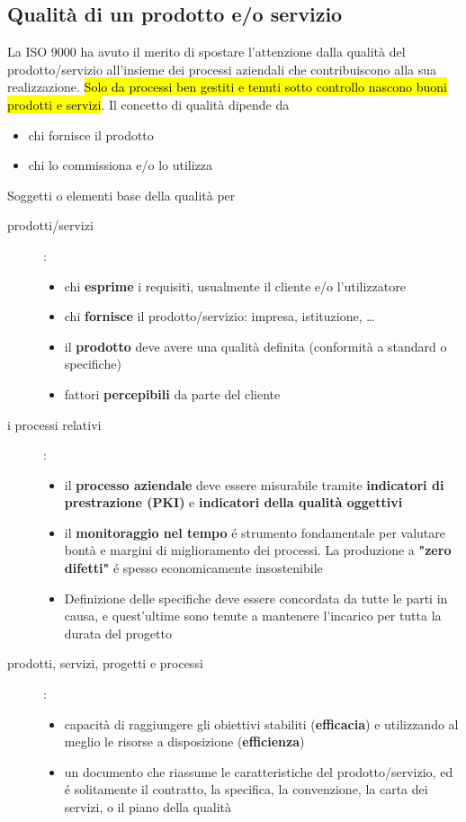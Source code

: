 \documentclass[a4paper]{article}
\begin{document}
\subsection{Qualità di un prodotto e/o servizio}
La ISO 9000 ha avuto il merito di spostare l'attenzione dalla qualità del prodotto/servizio 
all'insieme dei processi aziendali che contribuiscono alla sua realizzazione. \hl{Solo da 
processi ben gestiti e tenuti sotto controllo nascono buoni prodotti e servizi}.\newline
Il concetto di qualità dipende da
\begin{itemize}
    \item chi fornisce il prodotto
    \item chi lo commissiona e/o lo utilizza
\end{itemize}
Soggetti o elementi base della qualità per
\begin{description}
    \item[prodotti/servizi]:
    \begin{itemize}
        \item chi \textbf{esprime} i requisiti, usualmente il cliente e/o l'utilizzatore
        \item chi \textbf{fornisce} il prodotto/servizio: impresa, istituzione, \dots
        \item il \textbf{prodotto} deve avere una qualità definita (conformità a standard o specifiche)
        \item fattori \textbf{percepibili} da parte del cliente
    \end{itemize}
    \item[i processi relativi]:
    \begin{itemize}
        \item il \textbf{processo aziendale} deve essere misurabile tramite 
        \textbf{indicatori di prestrazione (PKI)} e \textbf{indicatori della qualità oggettivi}
        \item il \textbf{monitoraggio nel tempo} é strumento fondamentale per valutare 
        bontà e margini di miglioramento dei processi. La produzione a \textbf{"zero difetti"}
        é spesso economicamente insostenibile
        \item Definizione delle specifiche deve essere concordata da tutte le parti in causa, 
        e quest'ultime sono tenute a mantenere l'incarico per tutta la durata del progetto
    \end{itemize}
    \item[prodotti, servizi, progetti e processi]:
    \begin{itemize}
        \item capacità di raggiungere gli obiettivi stabiliti (\textbf{efficacia}) e 
        utilizzando al meglio le risorse a disposizione (\textbf{efficienza})
        \item un documento che riassume le caratteristiche del prodotto/servizio, ed é 
        solitamente il contratto, la specifica, la convenzione, la carta dei servizi, 
        o il piano della qualità
    \end{itemize} 
\end{description}
\end{document}
